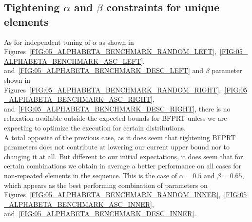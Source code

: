 \subsection{Tightening $\alpha$ and $\beta$ constraints for unique elements}

As for independent tuning of $\alpha$ as shown in Figures~\ref{FIG:05_ALPHABETA_BENCHMARK_RANDOM_LEFT},~\ref{FIG:05_ALPHABETA_BENCHMARK_ASC_LEFT}, and~\ref{FIG:05_ALPHABETA_BENCHMARK_DESC_LEFT} and $\beta$ parameter shown in Figures~\ref{FIG:05_ALPHABETA_BENCHMARK_RANDOM_RIGHT},~\ref{FIG:05_ALPHABETA_BENCHMARK_ASC_RIGHT}, and~\ref{FIG:05_ALPHABETA_BENCHMARK_DESC_RIGHT}, there is no relaxation available outside the expected bounds for BFPRT unless we are expecting to optimize the execution for certain distributions.\\

A total opposite of the previous case, as it does seem that tightening BFPRT parameters does not contribute at lowering our current upper bound nor to changing it at all. But different to our initial expectations, it does seem that for certain combinations we obtain in average a better performance on all cases for non-repeated elements in the sequence. This is the case of $\alpha=0.5$ and $\beta=0.65$, which appears as the best performing combination of parameters on Figures~\ref{FIG:05_ALPHABETA_BENCHMARK_RANDOM_INNER},~\ref{FIG:05_ALPHABETA_BENCHMARK_ASC_INNER}, and~\ref{FIG:05_ALPHABETA_BENCHMARK_DESC_INNER}. \\



